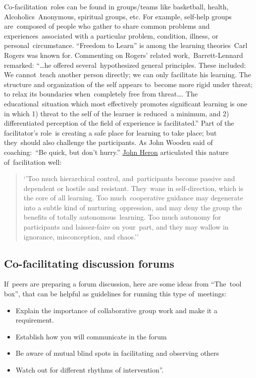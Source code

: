 Co-facilitation~roles can be found in groups/teams like basketball,
health, Alcoholics~Anonymous, spiritual groups, etc. For example,
self-help groups are~composed of people who gather to share common
problems and experiences~associated with a particular problem,
condition, illness, or personal~circumstance. ``Freedom to Learn'' is
among the learning theories~Carl Rogers was known for. Commenting on
Rogers' related work,~Barrett-Lennard remarked: ``\ldots{}he offered
several~hypothesized general principles. These included: We cannot~teach
another person directly; we can only facilitate his learning. The
structure and organization of the self appears to~become more rigid
under threat; to relax its boundaries when~completely free from
threat\ldots{}. The educational~situation which most effectively
promotes significant learning is one in which 1) threat to the self of
the learner is reduced~a minimum, and 2) differentiated perception of
the field of experience is facilitated.'' Part of the facilitator's
role~is creating a safe place for learning to take place; but
they~should also challenge the participants. As John Wooden said of
coaching:~``Be quick, but don't hurry.''
\href{http://en.wikipedia.org/wiki/John\_Heron}{John Heron} articulated
this nature of~facilitation well:

\begin{quote}
`'Too much hierarchical control, and~participants become passive and
dependent or hostile and resistant. They~wane in self-direction, which
is the core of all learning. Too much~cooperative guidance may
degenerate into a subtle kind of nurturing~oppression, and may deny the
group the benefits of totally autonomous~learning. Too much autonomy for
participants and laissez-faire on your~part, and they may wallow in
ignorance, misconception, and chaos.''
\end{quote}

\subsection{Co-facilitating discussion forums}

If~peers are preparing a forum discussion, here are some ideas from
``The~tool box'', that can be helpful as guidelines for running this
type of~meetings:

\begin{itemize}
\item
  Explain the importance of collaborative group work and make it a
  requirement.
\item
  Establish how you will communicate in the forum
\item
  Be aware of mutual blind spots in facilitating and observing others
\item
  Watch out for different rhythms of intervention''.
\end{itemize}

